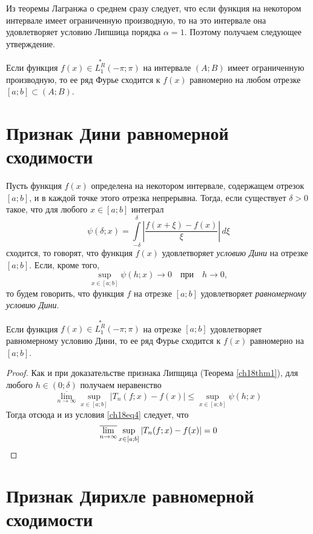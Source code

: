 Из теоремы Лагранжа о среднем сразу следует, что если функция на некотором интервале имеет ограниченную производную, то на это интервале она удовлетворяет условию Липшица порядка $\alpha = 1$. Поэтому получаем следующее утверждение.
\begin{cons}
Если функция $f(x) \in \overset{*}{L^{R}_1}(-\pi;\pi)$ на интервале $(A;B)$ имеет ограниченную производную, то ее ряд Фурье сходится к $f(x)$ равномерно на любом отрезке $[a;b] \subset (A;B)$.
\end{cons}

\section{Признак Дини равномерной сходимости}
Пусть функция $f(x)$ определена на некотором интервале, содержащем отрезок $[a;b]$, и в каждой точке этого отрезка непрерывна. Тогда, если существует $\delta > 0$ такое, что для любого $x \in [a;b]$ интеграл
$$
\psi(\delta ; x) = \int\limits_{-\delta}^{\delta} \left|\frac{f(x + \xi) - f(x)}{\xi}\right|\, d\xi
$$
сходится, то говорят, что функция $f(x)$ удовлетворяет \textit{условию Дини} на отрезке $[a;b]$. Если, кроме того,
\begin{equation} \label{ch18eq4}
\sup\limits_{x \in [a;b]} \psi(h;x) \to 0 \quad \text{при} \quad h \to 0 ,
\end{equation}
то будем говорить, что функция $f$ на отрезке $[a;b]$ удовлетворяет \textit{равномерному условию Дини}.

\begin{thm}  \label{ch18thm2}
Если функция $f(x) \in \overset{*}{L^{R}_1}(-\pi;\pi)$ на отрезке $[a;b]$ удовлетворяет равномерному условию Дини, то ее ряд Фурье сходится к $f(x)$ равномерно на $[a;b]$.
\end{thm}
\begin{proof}
Как и при доказательстве признака Липщица (Теорема \ref{ch18thm1}), для любого $h \in (0;\delta)$ получаем неравенство
$$
\overline{\lim\limits_{n \to \infty}} \sup \limits_{x \in [a;b]} |T_n(f; x) - f(x)| \le \sup\limits_{x \in [a;b]} \psi(h;x)
$$
Тогда отсюда и из условия \eqref{ch18eq4} следует, что
\begin{equation*}
\overline{\lim\limits_{n \to \infty}} \sup \limits_{x \in [a;b]} |T_n(f; x) - f(x)| = 0 \qedhere
\end{equation*}
\end{proof}

\section{Признак Дирихле равномерной сходимости}

